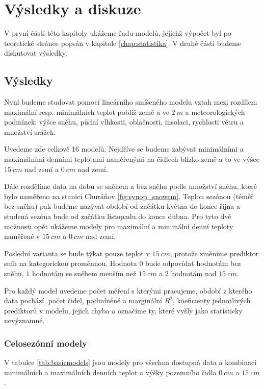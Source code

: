 \chapter{Výsledky a diskuze}\label{chap:ch3}
V první části této kapitoly ukážeme řadu modelů, jejichž výpočet byl po teoretické stránce popsán v kapitole \ref{chap:statistika}. V druhé části budeme diskutovat výsledky.

\section{Výsledky}
Nyní budeme studovat pomocí lineárního smíšeného modelu vztah mezi rozdílem maximální resp. minimálních teplot poblíž země a ve $\SI{2}{m}$ a meteorologických podmínek: výšce sněhu, půdní vlhkosti, oblačnosti, insolaci, rychlosti větru a množství srážek.

Uvedeme zde celkově 16 modelů. Nejdříve se budeme zabývat minimálními a maximálními denními teplotami naměřenými na čidlech blízko země a to ve výšce $\SI{15}{cm}$ nad zemí a $\SI{0}{cm}$ nad zemí. 

Dále rozdělíme data na dobu se sněhem a bez sněhu podle množství sněhu, které bylo naměřeno na stanici Churáňov \ref{fig:synop_snowcm}. Teplou sezónou (téměř bez sněhu) pak budeme nazývat období od začátku května do konce října a studená sezóna bude od začátku listopadu do konce dubna. Pro tyto dvě možnosti opět ukážeme modely pro maximální a minimální denní teploty naměřené v $\SI{15}{cm}$ a $\SI{0}{cm}$ nad zemí.

Poslední varianta se bude týkat pouze teplot v $\SI{15}{cm}$, protože změníme prediktor sníh na kategorickou proměnnou. Hodnota $0$ bude odpovídat hodnotám bez sněhu, $1$ hodnotám se sněhem menším než $\SI{15}{cm}$ a $2$ hodnotám nad $\SI{15}{cm}$.

Pro každý model uvedeme počet měření s kterými pracujeme, období z kterého data pochází, počet čidel, podmíněné a marginální $R^2$, koeficienty jednotlivých prediktorů v modelu, jejich chyba a označíme ty, které vyšly jako statisticky nevýznamné.

\subsection{Celosezónní modely}
V tabulce \ref{tab:basicmodels} jsou modely pro všechna dostupná data a kombinaci minimálních a maximálních denních teplot a výšky pozemního čidla $\SI{0}{cm}$ a $\SI{15}{cm}$.

